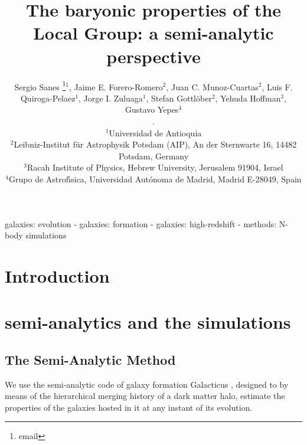 \documentclass[usenatbib]{mn2e}
\begin{document}
\title[The baryonic LG in SAMs]{The baryonic properties of the Local Group: a semi-analytic perspective}
\author[Sanes et al.]{
\parbox[t]{\textwidth}{\raggedright 
  Sergio Sanes \thanks{email}$^1$, 
  Jaime E. Forero-Romero$^2$,
  Juan C. Munoz-Cuartas$^2$,
  Luis F. \\Quiroga-Pelaez$^1$,
  Jorge I. Zuluaga$^1$,
  Stefan Gottl\"ober$^2$,
  Yehuda Hoffman$^3$,\\  
  Gustavo Yepes$^4$}.
\vspace*{6pt}\\
$^1$Universidad de Antioquia\\
$^2$Leibniz-Institut f\"ur Astrophysik Potsdam (AIP), An der Sternwarte 16, 14482 Potsdam, Germany\\ 
$^3$Racah Institute of Physics, Hebrew University, Jerusalem 91904, 
 Israel\\ 
$^4$Grupo de Astrof\'{\i}sica, Universidad Aut\'onoma de Madrid,   Madrid
E-28049, Spain\\
}
\maketitle

\begin{abstract}

\end{abstract}
\begin{keywords}
galaxies: evolution - galaxies: formation -
galaxies: high-redshift - methods: N-body simulations
\end{keywords}





\section{Introduction}
\label{sec:introduction}


\section{semi-analytics and the simulations}
\subsection{The Semi-Analytic Method}
\label{sec:sams}
We use the semi-analytic code of galaxy formation Galacticus \citep{2010arXiv1008.1786B}, designed to  by means of the hierarchical  merging
 history of a dark matter halo, estimate the properties of the galaxies hosted in it at any instant of its evolution.  
\end{document}
